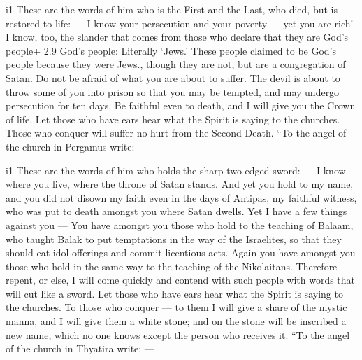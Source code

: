 i1 These are the words of him who is the First and the Last, who died,
but is restored to life: ---  I know your persecution and
your poverty --- yet you are rich! I know, too, the slander that comes
from those who declare that they are God's people+ 2.9 God's people:
Literally `Jews.' These people claimed to be God's people because they
were Jews., though they are not, but are a congregation of Satan.
 Do not be afraid of what you are about to suffer. The
devil is about to throw some of you into prison so that you may be
tempted, and may undergo persecution for ten days. Be faithful even to
death, and I will give you the Crown of life.  Let those
who have ears hear what the Spirit is saying to the churches. Those who
conquer will suffer no hurt from the Second Death.  ``To
the angel of the church in Pergamus write: ---

i1 These are the words of him who holds the sharp two-edged sword: ---
 I know where you live, where the throne of Satan stands.
And yet you hold to my name, and you did not disown my faith even in the
days of Antipas, my faithful witness, who was put to death amongst you
where Satan dwells.  Yet I have a few things against you
--- You have amongst you those who hold to the teaching of Balaam, who
taught Balak to put temptations in the way of the Israelites, so that
they should eat idol-offerings and commit licentious acts. 
Again you have amongst you those who hold in the same way to the
teaching of the Nikolaitans.  Therefore repent, or else, I
will come quickly and contend with such people with words that will cut
like a sword.  Let those who have ears hear what the Spirit
is saying to the churches. To those who conquer --- to them I will give
a share of the mystic manna, and I will give them a white stone; and on
the stone will be inscribed a new name, which no one knows except the
person who receives it.  ``To the angel of the church in
Thyatira write: ---

